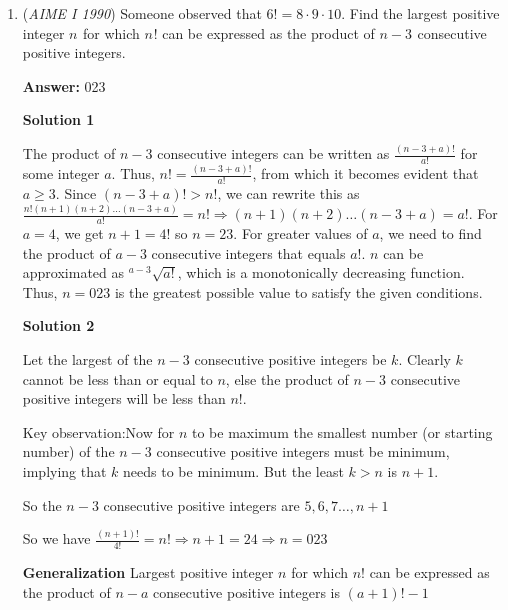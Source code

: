 \begin{enumerate}
 



\textbf{Solution 3}

The values in polar form will be $(1, 20x)$ and $(1, 7.5x)$. Multiplying these gives $(1, 27.5x)$. Then, we get $27.5$, $55$, $82.5$, $110$, $...$ up to $3960$ $(\text{lcm}(55,360)) \implies \frac{3960 \cdot 2}{55}=\boxed{144}$.

 


	\item (\textit{AIME I 1990}) Someone observed that $6! = 8 \cdot 9 \cdot 10$.  Find the largest positive integer $n^{}_{}$ for which $n^{}_{}!$ can be expressed as the product of $n - 3_{}^{}$ consecutive positive integers.


 
 \textbf{Answer: }023



\textbf{Solution 1}

The product of $n - 3$ consecutive integers can be written as $\frac{(n - 3 + a)!}{a!}$ for some integer $a$. Thus, $n! = \frac{(n - 3 + a)!}{a!}$, from which it  becomes evident that $a \ge 3$. Since $(n - 3 + a)! > n!$, we can rewrite this as $\frac{n!(n+1)(n+2) \ldots (n-3+a)}{a!} = n! \Longrightarrow (n+1)(n+2) \ldots (n-3+a) = a!$. For $a = 4$, we get $n + 1 = 4!$ so $n = 23$. For greater values of $a$, we need to find the product of $a-3$ consecutive integers that equals $a!$. $n$ can be approximated as $^{a-3}\sqrt{a!}$, which is a monotonically decreasing function. Thus, $n = \boxed{023}$ is the greatest possible value to satisfy the given conditions.

 



\textbf{Solution 2}

Let the largest of the $n-3$ consecutive positive integers be $k$. Clearly $k$ cannot be less than or equal to $n$, else the product of $n-3$ consecutive positive integers will be less than $n!$.

 Key observation:Now for $n$ to be maximum the smallest number (or starting number) of the $n-3$ consecutive positive integers must be minimum, implying that $k$ needs to be minimum. But the least $k > n$ is $n+1$.

 So the $n-3$ consecutive positive integers are $5, 6, 7\ldots, n+1$

 So we have $\frac{(n+1)!}{4!} = n!$$\Longrightarrow  n+1 = 24$$\Longrightarrow  n = \boxed{023}$

 \textbf{Generalization} Largest positive integer $n$ for which $n!$ can be expressed as the product of $n-a$ consecutive positive integers is $(a+1)! - 1$


\end{enumerate}
